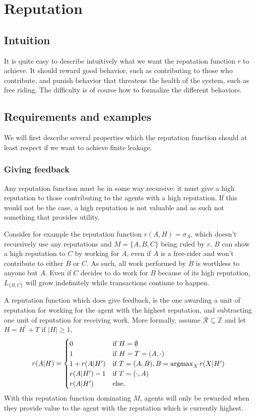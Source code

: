 \chapter{Reputation}\label{chapter:reputation}
\section{Intuition}
It is quite easy to describe intuitively what we want the reputation function $r$ to achieve. 
It should reward good behavior, 
such as contributing to those who contribute, 
and punish behavior that threatens the health of the system, 
such as free riding. 
The difficulty is of course how to formalize the different behaviors.

\section{Requirements and examples}\label{section:requirements_reputation}
We will first describe several properties which the reputation function should at least respect if we want to achieve finite leakage. 

\subsection{Giving feedback}
Any reputation function must be in some way recursive: it must give a high reputation to those contributing to the agents with a high reputation. If this would not be the case, a high reputation is not valuable and as such not something that provides utility.

Consider for example the reputation function $r(A, H) = \sigma_A$, which doesn't recursively use any reputations and $M = \{ A, B, C \}$ being ruled by $r$. $B$ can show a high reputation to $C$ by working for $A$, even if $A$ is a free-rider and won't contribute to either $B$ or $C$. As such, all work performed by $B$ is worthless to anyone but $A$. Even if $C$ decides to do work for $B$ because of its high reputation, $L_{\{ B, C \}}$ will grow indefinitely while transactions continue to happen.

A reputation function which does give feedback, is the one awarding a unit of reputation for working for the agent with the highest reputation, and subtracting one unit of reputation for receiving work. More formally, assume $\mathcal{R} \subseteq \mathds{Z}$ and let $H = H^\prime + T$ if $|H| \geq 1$,
\[ r(A|H) = \begin{cases}
0 & \text{if } H = \emptyset\\
1 & \text{if } H = T = (A, \cdot)\\
1 + r(A|H^\prime) & \text{if } T = (A, B), B = \operatorname*{argmax}_X r(X|H^\prime)\\
r(A|H^\prime) - 1 & \text{if } T = (\cdot, A)\\
r(A|H^\prime) & \text{else}.\\ 
\end{cases} \]
With this reputation function dominating $M$, agents will only be rewarded when they provide value to the agent with the reputation which is currently highest.

